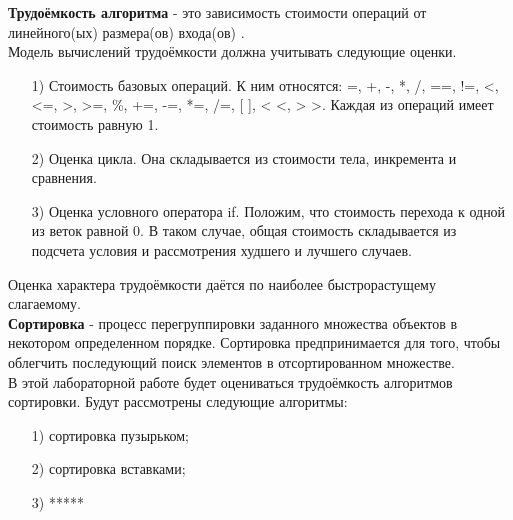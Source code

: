 \textbf{Трудоёмкость алгоритма} - это зависимость стоимости операций от линейного(ых) размера(ов) входа(ов) \cite{labor_int}.\\

Модель вычислений трудоёмкости должна учитывать следующие оценки.
\begin{itemize}
	\item[1)] Стоимость базовых операций. К ним относятся: =, +, -, *, /, ==, !=, <, <=, >, >=, \%, +=, -=, *=, /=, [ ], < <, > >. Каждая из операций имеет стоимость равную 1.
	\item[2)] Оценка цикла. Она складывается из стоимости тела, инкремента и сравнения. 
	\item[3)] Оценка условного оператора if. Положим, что стоимость перехода к одной из веток равной 0. В таком случае, общая стоимость складывается из подсчета условия и рассмотрения худшего и лучшего случаев.
\end{itemize}

Оценка характера трудоёмкости даётся по наиболее быстрорастущему слагаемому.\\

\textbf{Сортировка} - процесс перегруппировки заданного множества объектов в некотором определенном порядке. Сортировка предпринимается для того, чтобы облегчить последующий поиск элементов в отсортированном множестве.\\

В этой лабораторной работе будет оцениваться трудоёмкость алгоритмов сортировки.
Будут рассмотрены следующие алгоритмы:
\begin{itemize}
	\item[1)] сортировка пузырьком;
	\item[2)] сортировка вставками;
	\item[3)] *****
\end{itemize}